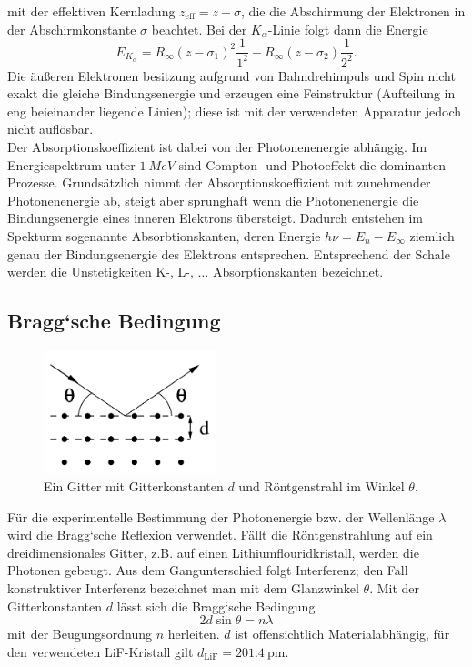 mit der effektiven Kernladung $z_\text{eff} = z - \sigma$, die die Abschirmung der
Elektronen in der Abschirmkonstante $\sigma$ beachtet. Bei der $K_\alpha$-Linie folgt dann
die Energie
\begin{equation}
	E_{K_\alpha} = R_\infty (z - \sigma_1)^2 \frac{1}{1^2} - R_\infty (z - \sigma_2)
	\frac{1}{2^2}.
\end{equation}
Die äußeren Elektronen besitzung aufgrund von Bahndrehimpuls und Spin nicht exakt die
gleiche Bindungsenergie und erzeugen eine Feinstruktur (Aufteilung in eng beieinander
liegende Linien); diese ist mit der verwendeten Apparatur jedoch nicht auflösbar.
\\
Der Absorptionskoeffizient ist dabei von der Photonenenergie abhängig. Im Energiespektrum
unter $\SI{1}{MeV}$ sind Compton- und Photoeffekt die dominanten Prozesse. Grundsätzlich
nimmt der Absorptionskoeffizient mit zunehmender Photonenenergie ab, steigt aber
sprunghaft wenn die Photonenenergie die Bindungsenergie eines inneren Elektrons
übersteigt. Dadurch entstehen im Spekturm sogenannte Absorbtionskanten, deren Energie
$h\nu = E_n - E_\infty$ ziemlich genau der Bindungsenergie des Elektrons entsprechen.
Entsprechend der Schale werden die Unstetigkeiten K-, L-, $\hdots$ Absorptionskanten
bezeichnet.

\subsection{Bragg`sche Bedingung}
\label{sec:Bragg`sche Bedingung}
\begin{figure}
	\begin{center}
		\includegraphics[width=5cm]{images/gitter.png}
	\caption{Ein Gitter mit Gitterkonstanten $d$ und Röntgenstrahl im Winkel
	$\theta$.}
	\end{center}
	\label{fig:gitter}
\end{figure}
Für die experimentelle Bestimmung der Photonenergie bzw. der Wellenlänge $\lambda$ wird
die Bragg`sche Reflexion verwendet. Fällt die Röntgenstrahlung auf ein
dreidimensionales Gitter, z.B. auf einen Lithiumflouridkristall, werden die Photonen
gebeugt. Aus dem Gangunterschied folgt Interferenz; den Fall konstruktiver Interferenz
bezeichnet man mit dem Glanzwinkel $\theta$. Mit der Gitterkonstanten $d$ lässt sich die
Bragg`sche Bedingung
\begin{equation}
	2d \sin\theta = n\lambda
	\label{eqn:braggsche-bedingung}
\end{equation}
mit der Beugungsordnung $n$ herleiten. $d$ ist offensichtlich Materialabhängig, für den
verwendeten LiF-Kristall gilt $d_\text{LiF} = \SI{201.4}{\pm}$.

